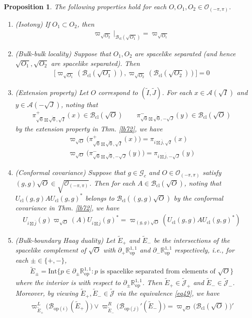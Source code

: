 \documentclass[11pt,b5paper,notitlepage]{article}
\theoremstyle{definition}
\theoremstyle{plain}
\newtheorem{pp}[df]{Proposition}
\newcommand{\wtd}{\widetilde}
\newcommand{\ovl}{\overline}
\newcommand{\Jtd}{\widetilde{\mathcal J}}
\newcommand{\Gc}{\mathscr G_c}
\newcommand{\Int}{\mathrm{Int}}
\newcommand{\MA}{\mathcal A}
\newcommand{\sqz}{{\sqrt 0}}
\newcommand{\Rop}{\mathbb R^{1,1}_{\mathrm{op}}}
\newcommand{\Bcl}{\mathcal B_{\mathrm{cl}}}
\newcommand{\Opp}{\mathcal O_{(-\pi,\pi)}}
\newcommand{\ZOpp}{\sqrt{\mathcal O_{(-\pi,\pi)}}}
\newcommand{\Ucl}{U_{\mathrm{cl}}}
\newcommand{\Bopi}{\mathcal B_{\mathrm{op}(i)}}
\newcommand{\Bopj}{\mathcal B_{\mathrm{op}(j)}}
\numberwithin{equation}{section}
\begin{document}
\begin{pp}\label{lb124}
The following properties hold for each $O,O_1,O_2\in\Opp$.
\begin{enumerate}[label=(\arabic*)]
\item (Isotony) If $O_1\subset O_2$, then
\begin{align*}
\varpi_{\sqrt{O_2}}\big|_{\Bcl(\sqrt{O_1})}=\varpi_{\sqrt{O_1}}
\end{align*}
\item (Bulk-bulk locality) Suppose that $O_1,O_2$ are spacelike separated (and hence $\sqrt{O_1},\sqrt{O_2}$ are spacelike separated). Then
\begin{align*}
\big[\varpi_{\sqrt{O_1}}(\Bcl(\sqrt{O_1})),\varpi_{\sqrt{O_2}}(\Bcl(\sqrt{O_2}))\big]=0
\end{align*}
\item (Extension property) Let $O$ correspond to $(\wtd I,\wtd J)$. For each $x\in\MA(\sqrt I)$ and $y\in\MA(-\sqrt J)$, noting that
\begin{align*}
\pi^+_{\sqz\boxtimes\ovl\sqz,\sqrt I}(x)\in\Bcl(\sqrt O)\qquad \pi^-_{\sqz\boxtimes\ovl\sqz,-\sqrt J}(y)\in\Bcl(\sqrt O)
\end{align*}
by the extension property in Thm. \ref{lb72}, we have
\begin{gather*}
\varpi_{\sqrt O}\big(\pi^+_{\sqz\boxtimes\ovl\sqz,\sqrt I}(x)\big)=\pi_{i\boxtimes \ovl j,\sqrt I}(x)\\
\varpi_{\sqrt O}\big(\pi^-_{\sqz\boxtimes\ovl\sqz,-\sqrt J}(y)\big)=\pi_{i\boxtimes \ovl j,-\sqrt J}(y)
\end{gather*}
\item (Conformal covariance) Suppose that $g\in\Gc$ and $O\in\Opp$ satisfy $(g,g)\sqrt O\in\ZOpp$. Then for each $A\in\Bcl(\sqrt O)$, noting that $\Ucl(g,g)A\Ucl(g,g)^*$ belongs to $\Bcl((g,g)\sqrt O)$ by the conformal covariance in Thm. \ref{lb72}, we have
\begin{align*}
U_{i\boxtimes\ovl j}(g)\varpi_{\sqrt O}(A)U_{i\boxtimes\ovl j}(g)^*=\varpi_{(g,g)\sqrt O}(\Ucl(g,g)A\Ucl(g,g)^*)
\end{align*}
\item (Bulk-boundary Haag duality) Let $\wtd E_+$ and $\wtd E_-$ be the intersections of the spacelike complement of $\sqrt O$ with $\partial_+\Rop$ and $\partial_-\Rop$ respectively, i.e., for each $\pm\in\{+,-\}$,
\begin{gather*}
\wtd E_\pm=\Int\{p\in\partial_\pm\Rop:p\text{ is spacelike separated from elements of }\sqrt O\}
\end{gather*}
where the interior is with respect to $\partial_\pm\Rop$. Then $\wtd E_+\in\Jtd_+$ and $\wtd E_-\in\Jtd_-$. Moreover, by viewing $\wtd E_+,\wtd E_-\in\Jtd$ via the equivalence \eqref{eq49}, we have
\begin{align*}
\varpi^L_{\wtd E_+}\big(\Bopi(\wtd E_+)\big)\vee \varpi^R_{\wtd E_-}\big(\Bopj'(\wtd E_-)\big)=\varpi_{\sqrt O}\big(\Bcl(\sqrt O)\big)'
\end{align*}
\end{enumerate}
\end{pp}
\end{document}
